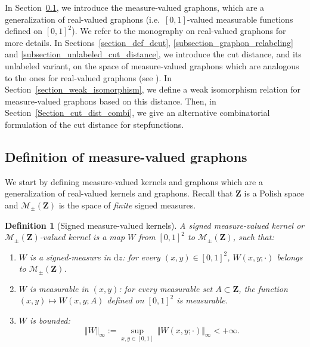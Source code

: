 \documentclass{amsart}
\newcommand{\ie}{i.e.\ }
\theoremstyle{plain}
\newtheorem{defin}[Th]{Definition}
\theoremstyle{definition}
\newcommand{\Space}{\mathbf{Z}}
\newcommand{\SignedMeas}{\mathcal{M}_{\pm}(\Space)}
\newcommand{\TotalMass}[1]{\norm{#1}_\infty}
\newcommand{\TM}[1]{\norm{#1}_\infty}
\newcommand{\rd}{\mathrm{d}}
\newcommand{\norm}[1]{\Vert#1\Vert}
\begin{document}
In Section~\ref{section_def_graphons},  we introduce  the measure-valued
graphons,  which   are a  generalization of
real-valued graphons (\ie $[0, 1]$-valued measurable
  functions defined on $[0, 1]^2$).  We refer to the monography
  \cite{Lovasz}  on real-valued graphons for more details.
In Sections~\ref{section_def_dcut}, \ref{subsection_graphon_relabeling} 
	and \ref{subsection_unlabeled_cut_distance}, 
we introduce  the cut distance, and its unlabeled variant, on the space of
measure-valued graphons  which are analogous  to the ones  for real-valued
graphons       (see       \cite[Chapter 8]{Lovasz}).        In
Section~\ref{section_weak_isomorphism},  we  define a  weak  isomorphism
relation for measure-valued  graphons based on this  distance.  Then, in
Section~\ref{Section_cut_dist_combi},    we    give    an    alternative
combinatorial formulation of the cut distance for stepfunctions.

\subsection{Definition of measure-valued graphons}\label{section_def_graphons}

We start by defining measure-valued kernels and graphons
which are a generalization of real-valued kernels and graphons.
Recall that $\Space$ is a Polish space
and $\SignedMeas$ is the space of \emph{finite} signed measures.

\begin{defin}[Signed measure-valued kernels]
A \emph{signed measure-valued kernel} or \emph{$\SignedMeas$-valued kernel}
is a map $W$ from $[0,1]^2$  to $\SignedMeas$, 
such that:
\begin{enumerate}[label=(\roman*)]
\item   $W$  is   a  \emph{signed-measure}   in  $\rd   z$:  for   every
  $(x,y) \in [0,1]^2$, $W(x,y;\cdot)$ belongs to $\SignedMeas$.
  
\item $W$ is \emph{measurable} in $(x,y)$: 
for every measurable set $A\subset \Space$, 
the function $(x,y)\mapsto W(x,y;A)$ defined on $[0,1]^2$ is measurable.

\item $W$ is \emph{bounded}:
\begin{equation}
   \label{eq:def:TM}
\TM{W}:=    \sup_{x,y\in [0, 1] }\, \TotalMass{W(x, y; \cdot)} <+\infty .
  \end{equation}  
\end{enumerate}
\end{defin}
\end{document}
